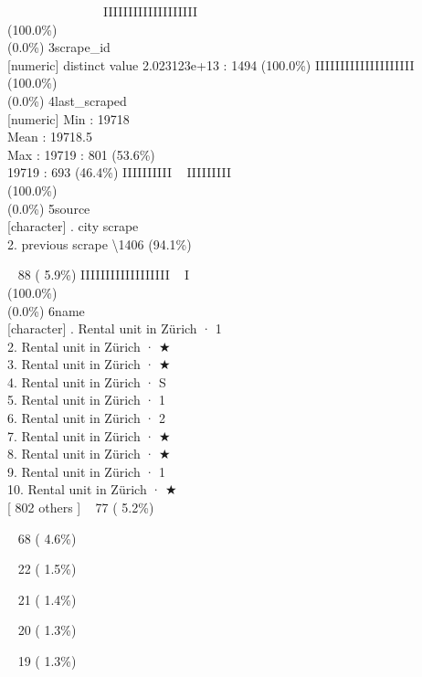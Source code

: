 \documentclass[
  journal,
]{IEEEtran}%
\begin{document}
~ ~ ~ ~ ~ ~ ~ ~ ~ IIIIIIIIIIIIIIIIIII \\
(100.0\%) \\
(0.0\%) \textbar{} \textbar{} 3\textbar scrape\_id\\
{[}numeric{]}  distinct value \textbar2.023123e+13 : 1494
(100.0\%) \textbar{} \textbar IIIIIIIIIIIIIIIIIIII \\
(100.0\%) \\
(0.0\%) \textbar{} \textbar{} 4\textbar last\_scraped\\
{[}numeric{]} \textbar Min : 19718\\
Mean : 19718.5\\
Max : 19719  : 801 (53.6\%)\\
19719 : 693 (46.4\%) \textbar{} \textbar IIIIIIIIII ~ IIIIIIIII
\\
(100.0\%) \\
(0.0\%) \textbar{} \textbar{} 5\textbar source\\
{[}character{]} . city scrape\\
2. previous scrape \textbar\textbackslash1406 (94.1\%)\\
\strut ~ 88 ( 5.9\%) \textbar{} \textbar IIIIIIIIIIIIIIIIII ~ I
\\
(100.0\%) \\
(0.0\%) \textbar{} \textbar{} 6\textbar name\\
{[}character{]} . Rental unit in Zürich · 1\\
2. Rental unit in Zürich · ★\\
3. Rental unit in Zürich · ★\\
4. Rental unit in Zürich · S\\
5. Rental unit in Zürich · 1\\
6. Rental unit in Zürich · 2\\
7. Rental unit in Zürich · ★\\
8. Rental unit in Zürich · ★\\
9. Rental unit in Zürich · 1\\
10. Rental unit in Zürich · ★\\
{[} 802 others {]} \textbar~ 77 ( 5.2\%)\\
\strut ~ 68 ( 4.6\%)\\
\strut ~ 22 ( 1.5\%)\\
\strut ~ 21 ( 1.4\%)\\
\strut ~ 20 ( 1.3\%)\\
\strut ~ 19 ( 1.3\%)\\
\end{document}
